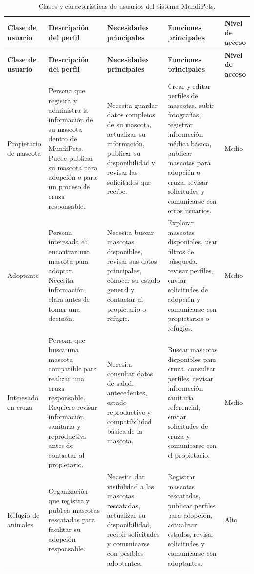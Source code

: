 \documentclass[journal,onecolumn]{IEEEtran}
\begin{document}
	\begin{longtable}{|p{2.2cm}|p{3.4cm}|p{3.4cm}|p{3.7cm}|p{1.2cm}|}
		\caption{Clases y características de usuarios del sistema MundiPets.} \label{tab:clases_usuario} \\
		\hline
		\textbf{Clase de usuario} & \textbf{Descripción del perfil} & \textbf{Necesidades principales} & \textbf{Funciones principales} & \textbf{Nivel de acceso} \\
		\hline
		\endfirsthead
		\hline
		\textbf{Clase de usuario} & \textbf{Descripción del perfil} & \textbf{Necesidades principales} & \textbf{Funciones principales} & \textbf{Nivel de acceso} \\
		\hline
		\endhead
		\hline
		\endfoot
		\hline
		\endlastfoot
		
		Propietario de mascota & Persona que registra y administra la información de su mascota dentro de MundiPets. Puede publicar su mascota para adopción o para un proceso de cruza responsable. & Necesita guardar datos completos de su mascota, actualizar su información, publicar su disponibilidad y revisar las solicitudes que recibe. & Crear y editar perfiles de mascotas, subir fotografías, registrar información médica básica, publicar mascotas para adopción o cruza, revisar solicitudes y comunicarse con otros usuarios. & Medio \\ \hline
		
		Adoptante & Persona interesada en encontrar una mascota para adoptar. Necesita información clara antes de tomar una decisión. & Necesita buscar mascotas disponibles, revisar sus datos principales, conocer su estado general y contactar al propietario o refugio. & Explorar mascotas disponibles, usar filtros de búsqueda, revisar perfiles, enviar solicitudes de adopción y comunicarse con propietarios o refugios. & Medio \\ \hline
		
		Interesado en cruza & Persona que busca una mascota compatible para realizar una cruza responsable. Requiere revisar información sanitaria y reproductiva antes de contactar al propietario. & Necesita consultar datos de salud, antecedentes, estado reproductivo y compatibilidad básica de la mascota. & Buscar mascotas disponibles para cruza, consultar perfiles, revisar información sanitaria referencial, enviar solicitudes de cruza y comunicarse con el propietario. & Medio \\ \hline
		
		Refugio de animales & Organización que registra y publica mascotas rescatadas para facilitar su adopción responsable. & Necesita dar visibilidad a las mascotas rescatadas, actualizar su disponibilidad, recibir solicitudes y comunicarse con posibles adoptantes. & Registrar mascotas rescatadas, publicar perfiles para adopción, actualizar estados, revisar solicitudes y comunicarse con adoptantes. & Alto \\ \hline
		

\end{longtable}
\end{document}
